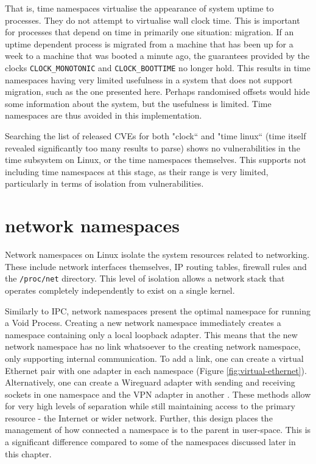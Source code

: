 \documentclass[12pt,a4paper,twoside]{report}
\begin{document}

That is, time namespaces virtualise the appearance of system uptime to processes. They do not attempt to virtualise wall clock time. This is important for processes that depend on time in primarily one situation: migration. If an uptime dependent process is migrated from a machine that has been up for a week to a machine that was booted a minute ago, the guarantees provided by the clocks \texttt{CLOCK\_MONOTONIC} and \texttt{CLOCK\_BOOTTIME} no longer hold. This results in time namespaces having very limited usefulness in a system that does not support migration, such as the one presented here. Perhaps randomised offsets would hide some information about the system, but the usefulness is limited. Time namespaces are thus avoided in this implementation.

Searching the list of released CVEs for both "clock`` and "time linux`` (time itself revealed significantly too many results to parse) shows no vulnerabilities in the time subsystem on Linux, or the time namespaces themselves. This supports not including time namespaces at this stage, as their range is very limited, particularly in terms of isolation from vulnerabilities.

\section{network namespaces}
\label{sec:voiding-net}

Network namespaces on Linux isolate the system resources related to networking. These include network interfaces themselves, IP routing tables, firewall rules and the \texttt{/proc/net} directory. This level of isolation allows a network stack that operates completely independently to exist on a single kernel.

Similarly to IPC, network namespaces present the optimal namespace for running a Void Process. Creating a new network namespace immediately creates a namespace containing only a local loopback adapter. This means that the new network namespace has no link whatsoever to the creating network namespace, only supporting internal communication. To add a link, one can create a virtual Ethernet pair with one adapter in each namespace (Figure \ref{fig:virtual-ethernet}). Alternatively, one can create a Wireguard adapter with sending and receiving sockets in one namespace and the VPN adapter in another \citep[§7.3]{donenfeld_wireguard_2017}. These methods allow for very high levels of separation while still maintaining access to the primary resource - the Internet or wider network. Further, this design places the management of how connected a namespace is to the parent in user-space. This is a significant difference compared to some of the namespaces discussed later in this chapter.
\end{document}
